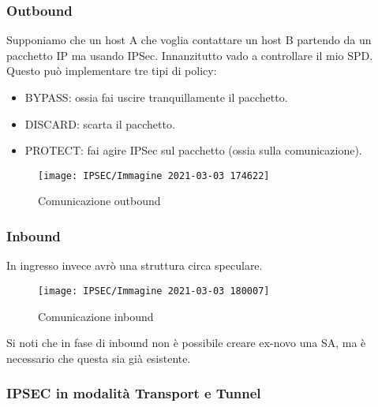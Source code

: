 \documentclass[14pt]{extreport}
\begin{document}
\subsubsection{Outbound}


Supponiamo che un host A che voglia contattare un host B partendo da un pacchetto IP ma usando IPSec.
Innanzitutto vado a controllare il mio SPD. Questo può implementare tre tipi di policy:


\begin{itemize}
    \item BYPASS: ossia fai uscire tranquillamente il pacchetto.
    
    
    \item DISCARD: scarta il pacchetto.
    
    
    \item PROTECT: fai agire IPSec sul pacchetto (ossia sulla comunicazione).
\end{itemize}





\begin{figure}[H]
    \centering
    \texttt{[image: IPSEC/Immagine 2021-03-03 174622]}
    \caption{Comunicazione outbound}
    \label{IPSEC3}
\end{figure}



\subsubsection{Inbound}

In ingresso invece avrò una struttura circa speculare.








\begin{figure}[H]
    \centering
    \texttt{[image: IPSEC/Immagine 2021-03-03 180007]}
    \caption{Comunicazione inbound}
    \label{IPSEC4}
\end{figure}

Si noti che in fase di inbound non è possibile creare ex-novo una SA, ma è necessario che questa sia già esistente.



\subsubsection{IPSEC in modalità Transport e Tunnel}
\end{document}
